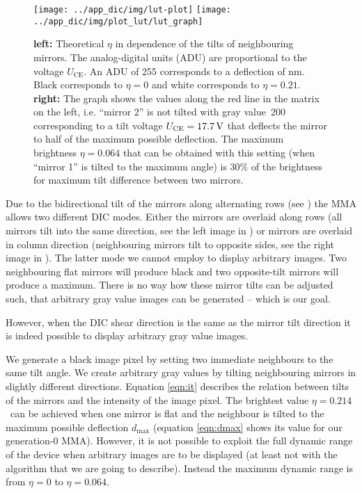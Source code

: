 \begin{figure}[htb]
  \centering
  \texttt{[image: ../app\_dic/img/lut-plot]}
  \texttt{[image: ../app\_dic/img/plot\_lut/lut\_graph]}
  \caption{{\bf left:} Theoretical $\eta$ in dependence of the tilts
    of neighbouring mirrors. The analog-digital units (ADU) are
    proportional to the voltage $U_\textrm{CE}$. An ADU of 255
    corresponds to a deflection of \unit[134]{nm}. Black corresponds
    to $\eta=0$ and white corresponds to $\eta=0.21$. {\bf right:} The
    graph shows the values along the red line in the matrix on the
    left, i.e. ``mirror 2'' is not tilted with gray value~200
    corresponding to a tilt voltage $U_\textrm{CE}=\unit[17.7]{V}$
    that deflects the mirror to half of the maximum possible
    deflection. The maximum brightness $\eta=0.064$ that can be
    obtained with this setting (when ``mirror 1'' is tilted to the
    maximum angle) is $30\%$ of the brightness for maximum tilt
    difference between two mirrors.}
  \label{fig:deflection2}
\end{figure}

Due to the bidirectional tilt of the mirrors along alternating rows
(see ) the MMA allows two different DIC modes.
Either the mirrors are overlaid along rows (all mirrors tilt into the
same direction, see the left image in ) or mirrors
are overlaid in column direction (neighbouring mirrors tilt to
opposite sides, see the right image in ). The
latter mode we cannot employ to display arbitrary images.  Two
neighbouring flat mirrors will produce black and two opposite-tilt
mirrors will produce a maximum. There is no way how these mirror tilts
can be adjusted such, that arbitrary gray value images can be
generated -- which is our goal.

However, when the DIC shear direction is the same as the mirror tilt direction
it is indeed possible to display arbitrary gray value images.

We generate a black image pixel by setting two immediate neighbours to
the same tilt angle. We create arbitrary gray values by tilting
neighbouring mirrors in slightly different directions. Equation
\eqref{eqn:it} describes the relation between tilts of the mirrors and
the intensity of the image pixel. The brightest value
$\eta=0.214$\ can be achieved when one mirror is flat and
the neighbour is tilted to the maximum possible deflection
$d_\textrm{max}$ (equation \eqref{eqn:dmax} shows its value for our
generation-0 MMA).  However, it is not possible to exploit the full
dynamic range of the device when arbitrary images are to be displayed
(at least not with the algorithm that we are going to describe).
Instead the maximum dynamic range is from $\eta=0$ to $\eta=0.064$.

